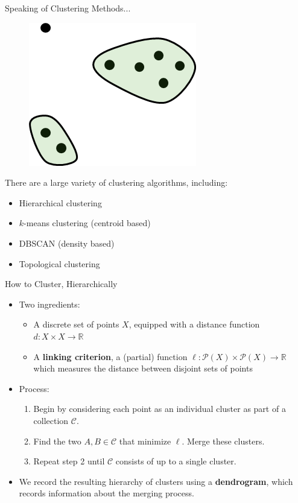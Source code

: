 \documentclass{beamer}
\begin{document}
  \begin{frame}{Speaking of Clustering Methods...}
    \begin{figure}
      \begin{center}
        \includegraphics[width=.5\textwidth]{threeclusters.png}
      \end{center}
    \end{figure}
    There are a large variety of clustering algorithms, including:
    \begin{itemize}
        \item Hierarchical clustering
        \item $k$-means clustering (centroid based)
        \item DBSCAN (density based)
        \item Topological clustering
    \end{itemize}
  \end{frame}
  
  \begin{frame}{How to Cluster, Hierarchically}
    \begin{itemize}
      \item Two ingredients:
      \begin{itemize}
        \item A discrete set of points $X$, equipped with a distance function $d:X\times X\to\mathbb{R}$
        \item A \textbf{linking criterion}, a (partial) function $\ell: \mathscr{P}(X)\times\mathscr{P}(X)\to\mathbb{R}$ which measures the distance between disjoint sets of points
      \end{itemize}
      \item Process:
      \begin{enumerate}
        \item Begin by considering each point as an individual cluster as part of a collection $\mathcal{C}$.
        \item Find the two $A,B\in\mathcal{C}$ that minimize $\ell$. Merge these clusters.
        \item Repeat step 2 until $\mathcal{C}$ consists of up to a single cluster.
      \end{enumerate}
      \item We record the resulting hierarchy of clusters using a \textbf{dendrogram}, which records information about the merging process.
    \end{itemize}
  \end{frame}
  
\end{document}
